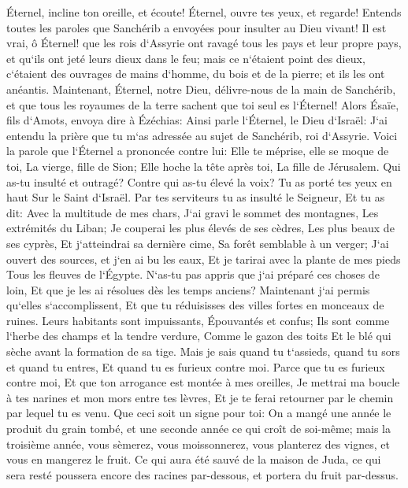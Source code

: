 \verse Éternel, incline ton oreille, et écoute! Éternel, ouvre tes yeux, et regarde! Entends toutes les paroles que Sanchérib a envoyées pour insulter au Dieu vivant! 
\verse Il est vrai, ô Éternel! que les rois d`Assyrie ont ravagé tous les pays et leur propre pays, 
\verse et qu`ils ont jeté leurs dieux dans le feu; mais ce n`étaient point des dieux, c`étaient des ouvrages de mains d`homme, du bois et de la pierre; et ils les ont anéantis. 
\verse Maintenant, Éternel, notre Dieu, délivre-nous de la main de Sanchérib, et que tous les royaumes de la terre sachent que toi seul es l`Éternel! 
\verse Alors Ésaïe, fils d`Amots, envoya dire à Ézéchias: Ainsi parle l`Éternel, le Dieu d`Israël: J`ai entendu la prière que tu m`as adressée au sujet de Sanchérib, roi d`Assyrie. 
\verse Voici la parole que l`Éternel a prononcée contre lui: Elle te méprise, elle se moque de toi, La vierge, fille de Sion; Elle hoche la tête après toi, La fille de Jérusalem. 
\verse Qui as-tu insulté et outragé? Contre qui as-tu élevé la voix? Tu as porté tes yeux en haut Sur le Saint d`Israël. 
\verse Par tes serviteurs tu as insulté le Seigneur, Et tu as dit: Avec la multitude de mes chars, J`ai gravi le sommet des montagnes, Les extrémités du Liban; Je couperai les plus élevés de ses cèdres, Les plus beaux de ses cyprès, Et j`atteindrai sa dernière cime, Sa forêt semblable à un verger; 
\verse J`ai ouvert des sources, et j`en ai bu les eaux, Et je tarirai avec la plante de mes pieds Tous les fleuves de l`Égypte. 
\verse N`as-tu pas appris que j`ai préparé ces choses de loin, Et que je les ai résolues dès les temps anciens? Maintenant j`ai permis qu`elles s`accomplissent, Et que tu réduisisses des villes fortes en monceaux de ruines. 
\verse Leurs habitants sont impuissants, Épouvantés et confus; Ils sont comme l`herbe des champs et la tendre verdure, Comme le gazon des toits Et le blé qui sèche avant la formation de sa tige. 
\verse Mais je sais quand tu t`assieds, quand tu sors et quand tu entres, Et quand tu es furieux contre moi. 
\verse Parce que tu es furieux contre moi, Et que ton arrogance est montée à mes oreilles, Je mettrai ma boucle à tes narines et mon mors entre tes lèvres, Et je te ferai retourner par le chemin par lequel tu es venu. 
\verse Que ceci soit un signe pour toi: On a mangé une année le produit du grain tombé, et une seconde année ce qui croît de soi-même; mais la troisième année, vous sèmerez, vous moissonnerez, vous planterez des vignes, et vous en mangerez le fruit. 
\verse Ce qui aura été sauvé de la maison de Juda, ce qui sera resté poussera encore des racines par-dessous, et portera du fruit par-dessus. 

